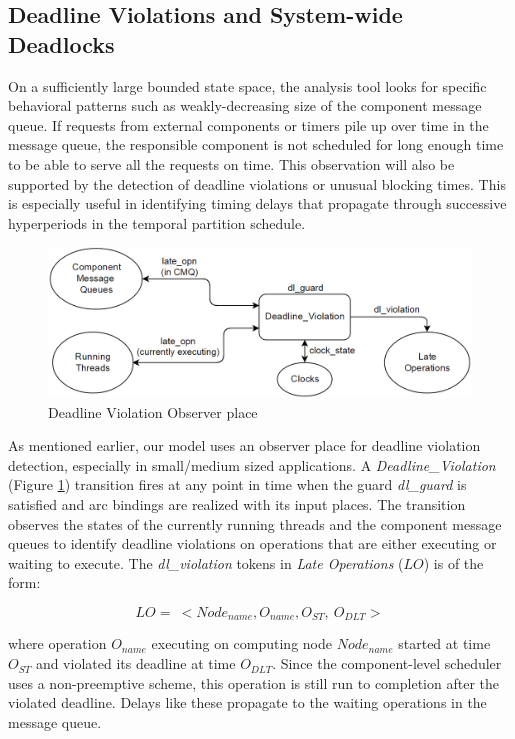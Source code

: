 \subsection{Deadline Violations and System-wide Deadlocks}

On a sufficiently large bounded state space, the analysis tool looks for specific behavioral patterns such as weakly-decreasing size of the component message queue. If requests from external components or timers pile up over time in the message queue, the responsible component is not scheduled for long enough time to be able to serve all the requests on time. This observation will also be supported by the detection of deadline violations or unusual blocking times. This is especially useful in identifying timing delays that propagate through successive hyperperiods in the temporal partition schedule. 

\begin{figure}[htb]
	\centering
	\includegraphics[width=\textwidth]{./img/Deadline_Violations.png}
	\caption{Deadline Violation Observer place}
	\label{fig:DL}
\end{figure}

As mentioned earlier, our model uses an observer place for deadline violation detection, especially in small/medium sized applications. A \emph{Deadline\_Violation} (Figure \ref{fig:DL}) transition fires at any point in time when the guard \emph{dl\_guard} is satisfied and arc bindings are realized with its input places. The transition observes the states of the currently running threads and the component message queues to identify deadline violations on operations that are either executing or waiting to execute. The \emph{dl\_violation} tokens in \emph{Late Operations} ($LO$) is of the form:

\begin{equation}
\label{eq:DLV}
LO = \ <Node_{name}, O_{name}, O_{ST}, \ O_{DLT}>
\end{equation}

where operation $O_{name}$ executing on computing node $Node_{name}$ started at time $O_{ST}$ and violated its deadline at time $O_{DLT}$. Since the component-level scheduler uses a non-preemptive scheme, this operation is still run to completion after the violated deadline. Delays like these propagate to the waiting operations in the message queue.

